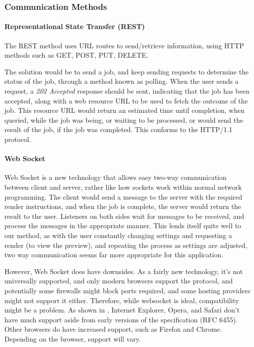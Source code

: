 \documentclass[10pt,a4paper]{article}
\begin{document}
\subsubsection{Communication Methods}
\paragraph{Representational State Transfer (REST)}
The REST method uses URL routes to send/retrieve information, using HTTP methods such as
GET, POST, PUT, DELETE.

The solution would be to send a job, and keep sending requests to determine the status of the job, through a
method known as polling. When the user sends a request, a \emph{202 Accepted} response should be sent,
indicating that the job has been accepted, along with a web resource URL to be used to fetch the outcome of
the job. This resource URL would return an estimated time until completion, when queried, while the job was being, or waiting to be processed,
or would send the result of the job, if the job was completed. This conforms to the HTTP/1.1 protocol. \cite{RESTandLongRunningJobs}


\paragraph{Web Socket}
Web Socket is a new technology that allows easy two-way communication between client and server, rather like how
sockets work within normal network programming. The client would send a message to the server with the required
render instructions, and when the job is complete, the server would return the result to the user. Listeners on both
sides wait for messages to be received, and process the messages in the appropriate manner.
\cite{WebsocketSpec}
This lends itself quite well to our method, as with the user constantly changing settings and requesting a render (to
view the preview), and repeating the process as settings are adjusted, two way communication seems far more appropriate
for this application.

However, Web Socket does have downsides. As a fairly new technology, it's not universally supported, and only modern browsers
support the protocol, and potentially some firewalls might block ports required, and some hosting providers might not support 
it either. Therefore, while websocket is ideal, compatibility might be a problem. As shown in \cite{WebSocketDeveloper},
Internet Explorer, Opera, and Safari don't have much support aside from early versions of the specification (RFC 6455). Other browsers
do have increased support, such as Firefox and Chrome. Depending on the browser, support will vary.
\end{document}
